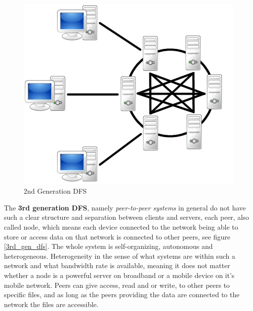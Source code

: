 	\begin{figure}[H]
		\begin{center}
		\includegraphics[scale=0.25]{Talk5/2nd_gen_dfs.PNG}
		\end{center}
		\caption{2nd Generation DFS}
		\label{2nd_gen_dfs}
	\end{figure}
The \textbf{3rd generation DFS}, namely \textit{peer-to-peer systems} in general do not have such a clear structure and separation between clients and servers, each peer, also called node, which means each device connected to the network being able to store or access data on that network is connected to other peers, see figure \ref{3rd_gen_dfs}. The whole system is self-organizing, autonomous and heterogeneous. Heterogeneity in the sense of what systems are within such a network and what bandwidth rate is available, meaning it does not matter whether a node is a powerful server on broadband or a mobile device on it's mobile network. Peers can give access, read and or write, to other peers to specific files, and as long as the peers providing the data are connected to the network the files are accessible.
